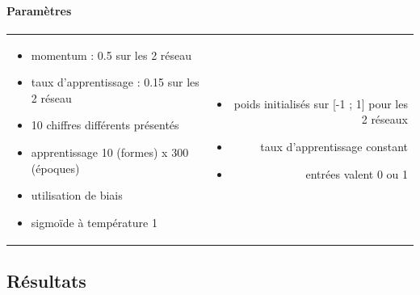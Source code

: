     \paragraph{Paramètres}
      \begin{center}
	\begin{tabular}{lr}
	  \begin{minipage}{230px}
	    \begin{itemize}
	      \item momentum : 0.5 sur les 2 réseau
	      \item taux d'apprentissage : 0.15 sur les 2 réseau
	      \item 10 chiffres différents présentés
	      \item apprentissage 10 (formes) x 300 (époques)
	      \item utilisation de biais
	      \item sigmoïde à température 1
	    \end{itemize}
	  \end{minipage}
	  &
	  \begin{minipage}{230px}
	    \begin{itemize}
	      \item poids initialisés sur [-1 ; 1] pour les 2 réseaux
	      \item taux d'apprentissage constant
	      \item entrées valent 0 ou 1
	    \end{itemize}
	  \end{minipage}
	\end{tabular}
      \end{center}

  
  \newpage
  \subsection{Résultats}
